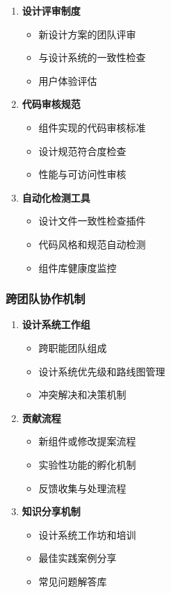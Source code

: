 \begin{enumerate}
\def\labelenumi{\arabic{enumi}.}
\tightlist
\item
  \textbf{设计评审制度}

  \begin{itemize}
  \tightlist
  \item
    新设计方案的团队评审
  \item
    与设计系统的一致性检查
  \item
    用户体验评估
  \end{itemize}
\item
  \textbf{代码审核规范}

  \begin{itemize}
  \tightlist
  \item
    组件实现的代码审核标准
  \item
    设计规范符合度检查
  \item
    性能与可访问性审核
  \end{itemize}
\item
  \textbf{自动化检测工具}

  \begin{itemize}
  \tightlist
  \item
    设计文件一致性检查插件
  \item
    代码风格和规范自动检测
  \item
    组件库健康度监控
  \end{itemize}
\end{enumerate}

\subsubsection{跨团队协作机制}\label{ux8de8ux56e2ux961fux534fux4f5cux673aux5236}

\begin{enumerate}
\def\labelenumi{\arabic{enumi}.}
\tightlist
\item
  \textbf{设计系统工作组}

  \begin{itemize}
  \tightlist
  \item
    跨职能团队组成
  \item
    设计系统优先级和路线图管理
  \item
    冲突解决和决策机制
  \end{itemize}
\item
  \textbf{贡献流程}

  \begin{itemize}
  \tightlist
  \item
    新组件或修改提案流程
  \item
    实验性功能的孵化机制
  \item
    反馈收集与处理流程
  \end{itemize}
\item
  \textbf{知识分享机制}

  \begin{itemize}
  \tightlist
  \item
    设计系统工作坊和培训
  \item
    最佳实践案例分享
  \item
    常见问题解答库
  \end{itemize}
\end{enumerate}

